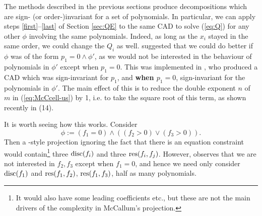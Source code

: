 \documentclass[runningheads,a4paper]{llncs}
\begin{document}
The methods described in the previous sections produce decompositions which are sign- (or order-)invariant for a set of polynomials.  In particular, we can apply steps \ref{first}--\ref{last} of Section \ref{sec:QE} to the same CAD to solve (\ref{eq:Q}) for any other $\phi$  involving the same polynomials. Indeed, as long as the $x_i$ stayed in the same order, we could change the $Q_i$ as well. \cite{Collins1998} suggested that we could do better if $\phi$ was of the form $p_1=0\land\phi'$, as we would not be interested in the behaviour of polynomials in $\phi'$ except when $p_1=0$. This was implemented in \cite{McCallum1999a}, who produced a CAD which was sign-invariant for $p_1$, and {\bf when $p_1=0$}, sign-invariant for the polynomials in $\phi'$. The main effect of this is to reduce the double exponent $n$ of $m$ in (\ref{eq:McCcell-us}) by 1, i.e. to take the square root of this term, as shown recently in 
\cite{Bradfordetal2014a} (14).
\par
It is worth seeing how this works. Consider
\begin{equation}\label{eq:EC}
\phi:=(f_1=0)\land\left((f_2>0)\lor(f_3>0)\right).
\end{equation}
Then a \cite{McCallum1984}-style projection ignoring the fact that there is an equation constraint would contain\footnote{It would also have some leading coefficients etc., but these are not the main drivers of the complexity in McCallum's projection.} three $\mathop{\rm disc}\nolimits(f_i)$ and three $\mathop{\rm res}\nolimits(f_i,f_j)$. However, \cite{McCallum1999a} observes that we are not interested in $f_2,f_3$ except when $f_1=0$, and hence we need only consider $\mathop{\rm disc}\nolimits(f_1)$ and $\mathop{\rm res}\nolimits(f_1,f_2)$, $\mathop{\rm res}\nolimits(f_1,f_3)$, half as many polynomials.
\end{document}
